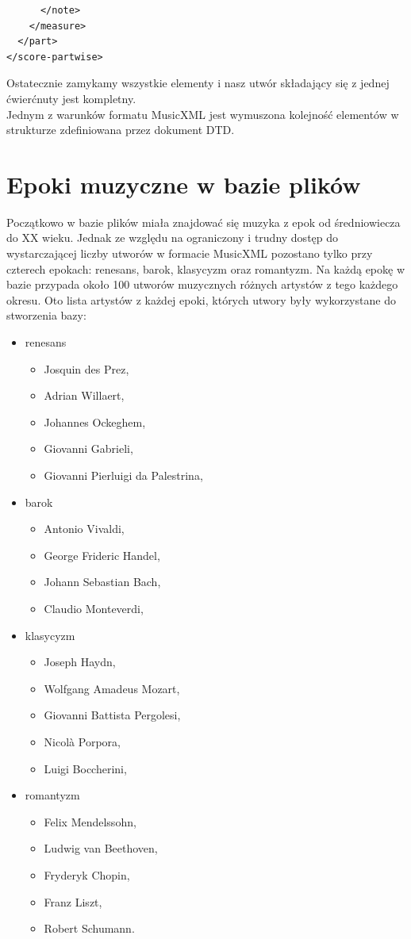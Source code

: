 \documentclass[printmode, eng, openany]{mgr}
\newcommand\tab[1][1cm]{\hspace*{#1}}
\begin{document}
\begin{lstlisting}
      </note>
    </measure>
  </part>
</score-partwise>
\end{lstlisting}
Ostatecznie zamykamy wszystkie elementy i nasz utwór składający się z jednej ćwierćnuty jest kompletny.\\

\tab Jednym z warunków formatu MusicXML jest wymuszona kolejność elementów w strukturze zdefiniowana przez dokument DTD. \cite{mxml}
\section{Epoki muzyczne w bazie plików}
\tab Początkowo w bazie plików miała znajdować się muzyka z epok od średniowiecza do XX wieku. Jednak ze względu na ograniczony i trudny dostęp do wystarczającej liczby utworów w formacie MusicXML pozostano tylko przy czterech epokach: renesans, barok, klasycyzm oraz romantyzm. Na każdą epokę w bazie przypada około 100 utworów muzycznych różnych artystów z tego każdego okresu. Oto lista artystów z każdej epoki, których utwory były wykorzystane do stworzenia bazy:
\begin{itemize}
\item renesans
\begin{itemize}
\item Josquin des Prez,
\item Adrian Willaert,
\item Johannes Ockeghem,
\item Giovanni Gabrieli,
\item Giovanni Pierluigi da Palestrina,
\end{itemize}
\item barok
\begin{itemize}
\item Antonio Vivaldi,
\item George Frideric Handel,
\item Johann Sebastian Bach,
\item Claudio Monteverdi,
\end{itemize}
\item klasycyzm
\begin{itemize}
\item Joseph Haydn,
\item Wolfgang Amadeus Mozart,
\item Giovanni Battista Pergolesi,
\item Nicolà Porpora,
\item Luigi Boccherini,
\end{itemize}
\item romantyzm
\begin{itemize}
\item Felix Mendelssohn,
\item Ludwig van Beethoven,
\item Fryderyk Chopin,
\item Franz Liszt,
\item Robert Schumann.
\end{itemize}
\end{itemize}
\end{document}
